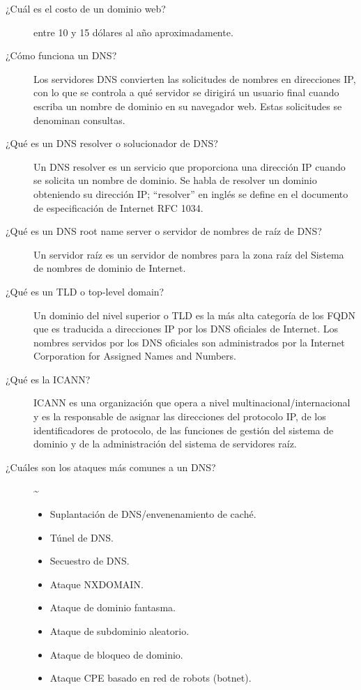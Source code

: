 \documentclass[11pt]{article}
\begin{document}
\begin{description}
\item[{¿Cuál es el costo de un dominio web?}] entre 10 y 15 dólares al
año aproximadamente.

\item[{¿Cómo funciona un DNS?}] Los servidores DNS convierten las
solicitudes de nombres en direcciones IP, con lo que se controla a
qué servidor se dirigirá un usuario final cuando escriba un nombre
de dominio en su navegador web. Estas solicitudes se denominan
consultas.

\item[{¿Qué es un DNS resolver o solucionador de DNS?}] Un DNS resolver es
un servicio que proporciona una dirección IP cuando se solicita un
nombre de dominio. Se habla de resolver un dominio obteniendo su
dirección IP; “resolver” en inglés se define en el documento de
especificación de Internet RFC 1034.

\item[{¿Qué es un DNS root name server o servidor de nombres de raíz de DNS?}] Un servidor raíz es un servidor de nombres para la zona raíz del
Sistema de nombres de dominio de Internet.

\item[{¿Qué es un TLD o top-level domain?}] Un dominio del nivel superior
o TLD es la más alta categoría de los FQDN que es traducida a
direcciones IP por los DNS oficiales de Internet. Los nombres
servidos por los DNS oficiales son administrados por la Internet
Corporation for Assigned Names and Numbers.

\item[{¿Qué es la ICANN?}] ICANN es una organización que opera a nivel
multinacional/internacional y es la responsable de asignar las
direcciones del protocolo IP, de los identificadores de protocolo,
de las funciones de gestión del sistema de dominio y de la
administración del sistema de servidores raíz.

\item[{¿Cuáles son los ataques más comunes a un DNS?}] \textasciitilde{}
\begin{itemize}
\item Suplantación de DNS/envenenamiento de caché.
\item Túnel de DNS.
\item Secuestro de DNS.
\item Ataque NXDOMAIN.
\item Ataque de dominio fantasma.
\item Ataque de subdominio aleatorio.
\item Ataque de bloqueo de dominio.
\item Ataque CPE basado en red de robots (botnet).
\end{itemize}
\end{description}
\end{document}
